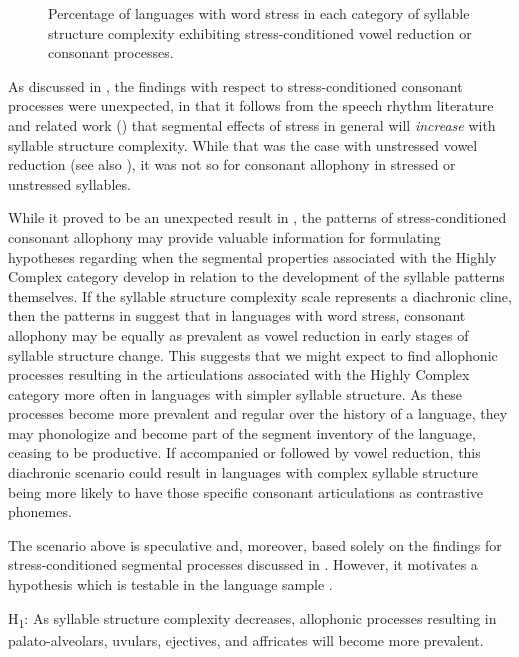   
\begin{figure}
\caption{\label{fig:7.1} Percentage of languages with word stress in each category of syllable structure complexity exhibiting stress-conditioned vowel reduction or consonant processes.}
\end{figure}

As discussed in , the findings with respect to stress-conditioned consonant processes were unexpected, in that it follows from the speech rhythm literature and related work (\citealt{BybeeEtAl1998,Schiering2007}) that segmental effects of stress in general will \textit{increase} with syllable structure complexity. While that was the case with unstressed vowel reduction (see also ), it was not so for consonant allophony in stressed or unstressed syllables.

  While it proved to be an unexpected result in , the patterns of stress-conditioned consonant allophony may provide valuable information for formulating hypotheses regarding when the segmental properties associated with the Highly Complex category develop in relation to the development of the syllable patterns themselves. If the syllable structure complexity scale represents a diachronic cline, then the patterns in  suggest that in languages with word stress, consonant allophony may be equally as prevalent as vowel reduction in early stages of syllable structure change. This suggests that we might expect to find allophonic processes resulting in the articulations associated with the Highly Complex category more often in languages with simpler syllable structure. As these processes become more prevalent and regular over the history of a language, they may phonologize and become part of the segment inventory of the language, ceasing to be productive. If accompanied or followed by vowel reduction, this diachronic scenario could result in languages with complex syllable structure being more likely to have those specific consonant articulations as contrastive phonemes.

  The scenario above is speculative and, moreover, based solely on the findings for stress-conditioned segmental processes discussed in . However, it motivates a hypothesis which is testable in the language sample .

\ea\label{ex:7.1}
  H\textsubscript{1}: As syllable structure complexity decreases, allophonic processes resulting in palato-alveolars, uvulars, ejectives, and affricates will become more prevalent.
\z

